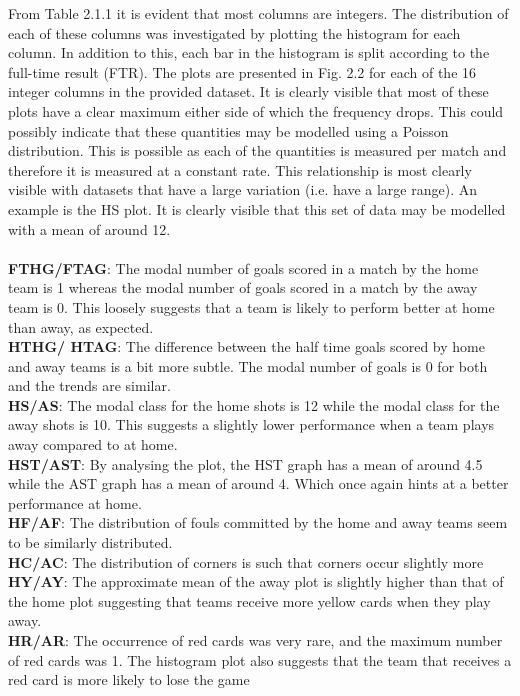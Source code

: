 \documentclass[a4paper,12pt]{article}
\begin{document}
		From Table 2.1.1 it is evident that most columns are integers. The distribution of each of these columns was investigated by plotting the histogram for each column. In addition to this, each bar in the histogram is split according to the full-time result (FTR). The plots are presented in Fig. 2.2 for each of the 16 integer columns in the provided dataset. It is clearly visible that most of these plots have a clear maximum either side of which the frequency drops. This could possibly indicate that these quantities may be modelled using a Poisson distribution. This is possible as each of the quantities is measured per match and therefore it is measured at a constant rate. This relationship is most clearly visible with datasets that have a large variation (i.e. have a large range). An example is the HS plot. It is clearly visible that this set of data may be modelled with a mean of around 12.\\
		\\
		\textbf{FTHG/FTAG}: The modal number of goals scored in a match by the home team is 1 whereas the modal number of goals scored in a match by the away team is 0. This loosely suggests that a team is likely to perform better at home than away, as expected.\\
		\textbf{HTHG/ HTAG}: The difference between the half time goals scored by home and away teams is a bit more subtle. The modal number of goals is 0 for both and the trends are similar.\\
		\textbf{HS/AS}: The modal class for the home shots is 12 while the modal class for the away shots is 10. This suggests a slightly lower performance when a team plays away compared to at home.\\
		\textbf{HST/AST}: By analysing the plot, the HST graph has a mean of around 4.5 while the AST graph has a mean of around 4. Which once again hints at a better performance at home.\\
		\textbf{HF/AF}: The distribution of fouls committed by the home and away teams seem to be similarly distributed.\\
		\textbf{HC/AC}: The distribution of corners is such that corners occur slightly more \\
		\textbf{HY/AY}: The approximate mean of the away plot is slightly higher than that of the home plot suggesting that teams receive more yellow cards when they play away.\\
		\textbf{HR/AR}: The occurrence of red cards was very rare, and the maximum number of red cards was 1. The histogram plot also suggests that the team that receives a red card is more likely to lose the game
		
\end{document}
